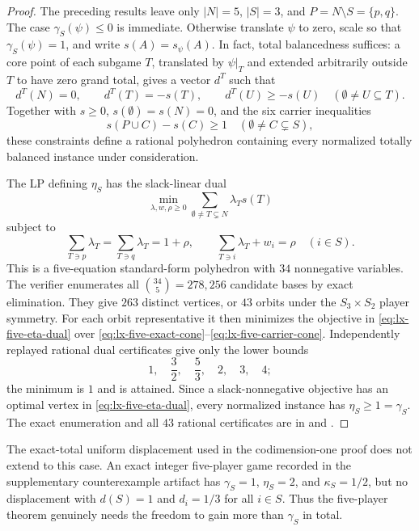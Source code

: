 \begin{proof}
The preceding results leave only $|N|=5$, $|S|=3$, and
$P=N\setminus S=\{p,q\}$.  The case $\gamma_S(\psi)\leq0$ is immediate.
Otherwise translate $\psi$ to zero, scale so that $\gamma_S(\psi)=1$, and
write $s(A)=s_\psi(A)$.  In fact, total balancedness suffices: a core point
of each subgame $T$, translated by $\psi|_T$ and extended arbitrarily outside
$T$ to have zero grand total, gives a vector $d^T$ such that
\[
 d^T(N)=0,\qquad d^T(T)=-s(T),\qquad
 d^T(U)\geq-s(U)\quad(\emptyset\ne U\subseteq T).
 \tag{X5}\label{eq:lx-five-exact-cone}
\]
Together with $s\geq0$, $s(\emptyset)=s(N)=0$, and the six carrier
inequalities
\[
 s(P\cup C)-s(C)\geq1
 \quad(\emptyset\ne C\subsetneq S),
 \tag{C5}\label{eq:lx-five-carrier-cone}
\]
these constraints define a rational polyhedron containing every normalized
totally balanced instance under consideration.

The LP defining $\eta_S$ has the slack-linear dual
\[
 \min_{\lambda,w,\rho\geq0}\sum_{\emptyset\ne T\subsetneq N}\lambda_Ts(T)
 \tag{E5}\label{eq:lx-five-eta-dual}
\]
subject to
\[
 \sum_{T\ni p}\lambda_T=\sum_{T\ni q}\lambda_T=1+\rho,
 \qquad
 \sum_{T\ni i}\lambda_T+w_i=\rho\quad(i\in S).
\]
This is a five-equation standard-form polyhedron with $34$ nonnegative
variables.  The verifier enumerates all $\binom{34}{5}=278{,}256$ candidate
bases by exact elimination.  They give $263$ distinct vertices, or $43$
orbits under the $S_3\times S_2$ player symmetry.  For each orbit
representative it then minimizes the objective in
\eqref{eq:lx-five-eta-dual} over
\eqref{eq:lx-five-exact-cone}--\eqref{eq:lx-five-carrier-cone}.
Independently replayed rational dual certificates give only the lower bounds
\[
 1,\quad \frac32,\quad \frac53,\quad 2,\quad 3,\quad 4;
\]
the minimum is $1$ and is attained.  Since a slack-nonnegative objective has
an optimal vertex in \eqref{eq:lx-five-eta-dual}, every normalized instance
has $\eta_S\geq1=\gamma_S$.  The exact enumeration and all $43$ rational
certificates are in
 and
.
\end{proof}

The exact-total uniform displacement used in the codimension-one proof does
not extend to this case.  An exact integer five-player game recorded in the
supplementary counterexample artifact has
$\gamma_S=1$, $\eta_S=2$, and $\kappa_S=1/2$, but no displacement with
$d(S)=1$ and $d_i=1/3$ for all $i\in S$.  Thus the five-player theorem
genuinely needs the freedom to gain more than $\gamma_S$ in total.

